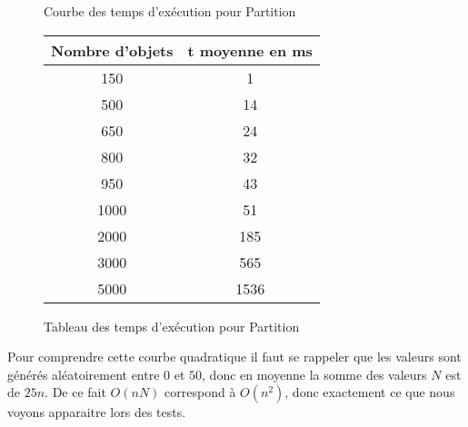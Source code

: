 \begin{figure}[ht]
\begin{minipage}[b]{0.5\linewidth}
\centering
{}
\caption {Courbe des temps d'exécution pour Partition}
\end{minipage}
\hspace{0.5cm}
\begin{minipage}[b]{0.5\linewidth}
\centering
\begin{tabular}[scale=0.9]{|c|c|}
\hline
Nombre d'objets & t moyenne en ms\\
\hline
150 & 1\\
\hline
500 & 14\\
\hline
650 & 24\\
\hline
800 & 32\\
\hline
950 & 43\\
\hline
1000 & 51\\
\hline
2000 & 185\\
\hline
3000 & 565\\
\hline
5000 & 1536\\
\hline
\end{tabular}
\caption {Tableau des temps d'exécution pour Partition}
\end{minipage}
\end{figure}

Pour comprendre cette courbe quadratique il faut se rappeler que les valeurs sont générés aléatoirement  entre $0$ et $50$, donc en moyenne la somme des valeurs $N$ est de $25n$. De ce fait $O(nN)$ correspond à $O(n^2)$, donc exactement ce que nous voyons apparaitre lors des tests.
